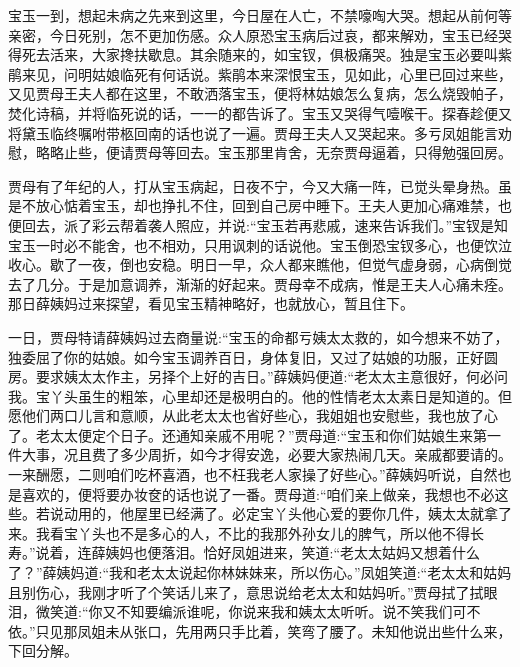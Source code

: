 \begin{parag}
    宝玉一到，想起未病之先来到这里，今日屋在人亡，不禁嚎啕大哭。想起从前何等亲密，今日死别，怎不更加伤感。众人原恐宝玉病后过哀，都来解劝，宝玉已经哭得死去活来，大家搀扶歇息。其余随来的，如宝钗，俱极痛哭。独是宝玉必要叫紫鹃来见，问明姑娘临死有何话说。紫鹃本来深恨宝玉，见如此，心里已回过来些，又见贾母王夫人都在这里，不敢洒落宝玉，便将林姑娘怎么复病，怎么烧毁帕子，焚化诗稿，并将临死说的话，一一的都告诉了。宝玉又哭得气噎喉干。探春趁便又将黛玉临终嘱咐带柩回南的话也说了一遍。贾母王夫人又哭起来。多亏凤姐能言劝慰，略略止些，便请贾母等回去。宝玉那里肯舍，无奈贾母逼着，只得勉强回房。
\end{parag}


\begin{parag}
    贾母有了年纪的人，打从宝玉病起，日夜不宁，今又大痛一阵，已觉头晕身热。虽是不放心惦着宝玉，却也挣扎不住，回到自己房中睡下。王夫人更加心痛难禁，也便回去，派了彩云帮着袭人照应，并说:“宝玉若再悲戚，速来告诉我们。”宝钗是知宝玉一时必不能舍，也不相劝，只用讽刺的话说他。宝玉倒恐宝钗多心，也便饮泣收心。歇了一夜，倒也安稳。明日一早，众人都来瞧他，但觉气虚身弱，心病倒觉去了几分。于是加意调养，渐渐的好起来。贾母幸不成病，惟是王夫人心痛未痊。那日薛姨妈过来探望，看见宝玉精神略好，也就放心，暂且住下。
\end{parag}


\begin{parag}
    一日，贾母特请薛姨妈过去商量说:“宝玉的命都亏姨太太救的，如今想来不妨了，独委屈了你的姑娘。如今宝玉调养百日，身体复旧，又过了姑娘的功服，正好圆房。要求姨太太作主，另择个上好的吉日。”薛姨妈便道:“老太太主意很好，何必问我。宝丫头虽生的粗笨，心里却还是极明白的。他的性情老太太素日是知道的。但愿他们两口儿言和意顺，从此老太太也省好些心，我姐姐也安慰些，我也放了心了。老太太便定个日子。还通知亲戚不用呢？”贾母道:“宝玉和你们姑娘生来第一件大事，况且费了多少周折，如今才得安逸，必要大家热闹几天。亲戚都要请的。一来酬愿，二则咱们吃杯喜酒，也不枉我老人家操了好些心。”薛姨妈听说，自然也是喜欢的，便将要办妆奁的话也说了一番。贾母道:“咱们亲上做亲，我想也不必这些。若说动用的，他屋里已经满了。必定宝丫头他心爱的要你几件，姨太太就拿了来。我看宝丫头也不是多心的人，不比的我那外孙女儿的脾气，所以他不得长寿。”说着，连薛姨妈也便落泪。恰好凤姐进来，笑道:“老太太姑妈又想着什么了？”薛姨妈道:“我和老太太说起你林妹妹来，所以伤心。”凤姐笑道:“老太太和姑妈且别伤心，我刚才听了个笑话儿来了，意思说给老太太和姑妈听。”贾母拭了拭眼泪，微笑道:“你又不知要编派谁呢，你说来我和姨太太听听。说不笑我们可不依。”只见那凤姐未从张口，先用两只手比着，笑弯了腰了。未知他说出些什么来，下回分解。
\end{parag}